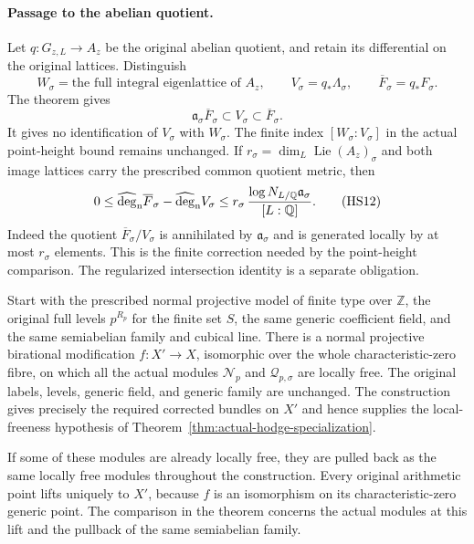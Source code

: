 \paragraph{Passage to the abelian quotient.}
Let $q:G_{z,L}\to A_z$ be the original abelian quotient, and retain
its differential on the original lattices. Distinguish
\[
 W_\sigma=\text{the full integral eigenlattice of }A_z,\qquad
 V_\sigma=q_*\Lambda_\sigma,\qquad
 \overline F_\sigma=q_*F_\sigma.
\]
The theorem gives
\[
 \mathfrak a_\sigma\overline F_\sigma
                       \subset V_\sigma\subset\overline F_\sigma.
 \tag{HS11}
\]
It gives no identification of $V_\sigma$ with $W_\sigma$.
The finite index $[W_\sigma:V_\sigma]$ in the actual point-height
bound remains unchanged. If $r_\sigma=\dim_L\operatorname{Lie}(A_z)_\sigma$
and both image lattices carry the prescribed common quotient
metric, then
\[
 0\le\widehat{\deg}_{\rm n}\overline F_\sigma
          -\widehat{\deg}_{\rm n}V_\sigma
 \le r_\sigma\,
      \frac{\log N_{L/\mathbb Q}\mathfrak a_\sigma}{[L:\mathbb Q]}.
 \tag{HS12}
\]
Indeed the quotient $\overline F_\sigma/V_\sigma$ is annihilated
by $\mathfrak a_\sigma$ and is generated locally by at most
$r_\sigma$ elements. This is the finite correction needed by the
point-height comparison. The regularized intersection identity
is a separate obligation.

\begin{proposition}
\label{prop:actual-hodge-free-model}
Start with the prescribed normal projective model of finite type
over $\mathbb Z$, the original full levels $p^{R_p}$ for the finite
set $S$, the same generic coefficient field, and the same
semiabelian family and cubical line. There is a normal projective
birational modification $f:X'\to X$, isomorphic over the whole
characteristic-zero fibre, on which all the actual modules
$\mathcal N_p$ and $\mathcal Q_{p,\sigma}$ are locally free.
The original labels, levels, generic field, and generic family
are unchanged. The construction gives precisely the required
corrected bundles on $X'$ and hence supplies the local-freeness
hypothesis of Theorem~\ref{thm:actual-hodge-specialization}.

If some of these modules are already locally free, they are
pulled back as the same locally free modules throughout the
construction. Every original arithmetic point lifts uniquely
to $X'$, because $f$ is an isomorphism on its characteristic-zero
generic point. The comparison in the theorem concerns the actual
modules at this lift and the pullback of the same semiabelian
family.
\end{proposition}


